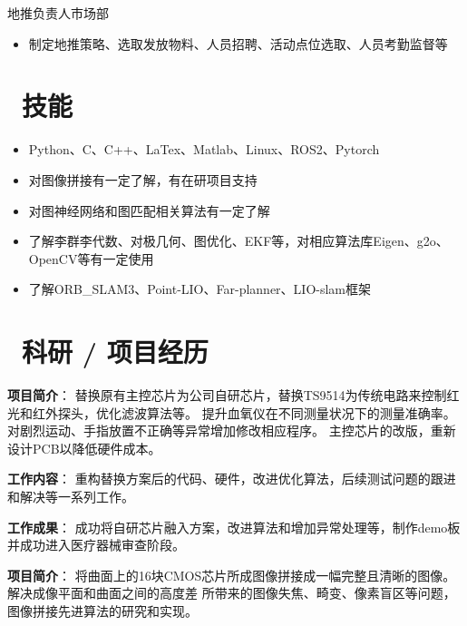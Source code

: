 \documentclass{resume}
\begin{document}
地推负责人\qquad \qquad \quad 市场部
\begin{itemize}
  \item 制定地推策略、选取发放物料、人员招聘、活动点位选取、人员考勤监督等
\end{itemize}

\section{\textcolor[RGB]{50,50,190}{\faCogs\ 技能}}
\begin{itemize}[parsep=0.5ex]
  \item Python、C、C++、LaTex、Matlab、Linux、ROS2、Pytorch
  \item 对图像拼接有一定了解，有在研项目支持
  \item 对图神经网络和图匹配相关算法有一定了解
  \item 了解李群李代数、对极几何、图优化、EKF等，对相应算法库Eigen、g2o、OpenCV等有一定使用
  \item 了解ORB\_SLAM3、Point-LIO、Far-planner、LIO-slam框架
\end{itemize}


\section{\textcolor[RGB]{50,50,190}{\faUsers\ 科研 / 项目经历}}

\textcolor[RGB]{80,100,190}{\textbf{项目简介}}：
替换原有主控芯片为公司自研芯片，替换TS9514为传统电路来控制红光和红外探头，优化滤波算法等。
提升血氧仪在不同测量状况下的测量准确率。对剧烈运动、手指放置不正确等异常增加修改相应程序。
主控芯片的改版，重新设计PCB以降低硬件成本。

\textcolor[RGB]{80,100,190}{\textbf{工作内容}}：
重构替换方案后的代码、硬件，改进优化算法，后续测试问题的跟进和解决等一系列工作。

\textcolor[RGB]{80,100,190}{\textbf{工作成果}}：
成功将自研芯片融入方案，改进算法和增加异常处理等，制作demo板并成功进入医疗器械审查阶段。

\textcolor[RGB]{80,100,190}{\textbf{项目简介}}：
将曲面上的16块CMOS芯片所成图像拼接成一幅完整且清晰的图像。解决成像平面和曲面之间的高度差
所带来的图像失焦、畸变、像素盲区等问题，图像拼接先进算法的研究和实现。
\end{document}
